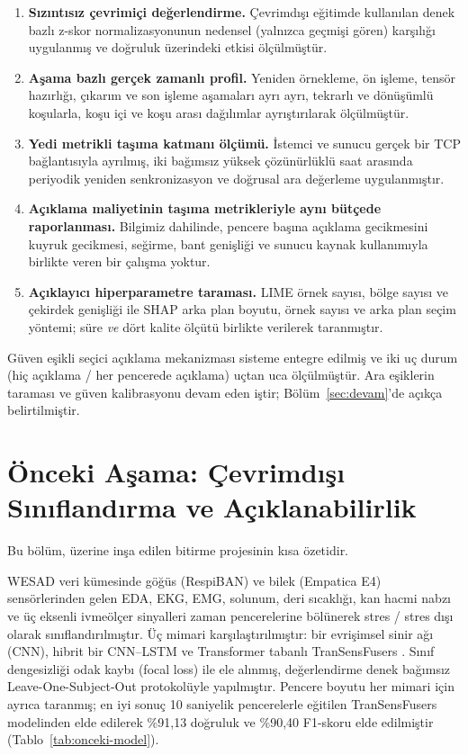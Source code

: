 \documentclass[conference]{IEEEtran}
\begin{document}
\begin{enumerate}
\item \textbf{Sızıntısız çevrimiçi değerlendirme.} Çevrimdışı eğitimde kullanılan
denek bazlı z-skor normalizasyonunun nedensel (yalnızca geçmişi gören) karşılığı
uygulanmış ve doğruluk üzerindeki etkisi ölçülmüştür.
\item \textbf{Aşama bazlı gerçek zamanlı profil.} Yeniden örnekleme, ön işleme,
tensör hazırlığı, çıkarım ve son işleme aşamaları ayrı ayrı, tekrarlı ve
dönüşümlü koşularla, koşu içi ve koşu arası dağılımlar ayrıştırılarak
ölçülmüştür.
\item \textbf{Yedi metrikli taşıma katmanı ölçümü.} İstemci ve sunucu gerçek bir
TCP bağlantısıyla ayrılmış, iki bağımsız yüksek çözünürlüklü saat arasında
periyodik yeniden senkronizasyon ve doğrusal ara değerleme uygulanmıştır.
\item \textbf{Açıklama maliyetinin taşıma metrikleriyle aynı bütçede
raporlanması.} Bilgimiz dahilinde, pencere başına açıklama gecikmesini kuyruk
gecikmesi, seğirme, bant genişliği ve sunucu kaynak kullanımıyla birlikte veren
bir çalışma yoktur.
\item \textbf{Açıklayıcı hiperparametre taraması.} LIME örnek sayısı, bölge
sayısı ve çekirdek genişliği ile SHAP arka plan boyutu, örnek sayısı ve arka plan
seçim yöntemi; süre \emph{ve} dört kalite ölçütü birlikte verilerek taranmıştır.
\end{enumerate}

Güven eşikli seçici açıklama mekanizması sisteme entegre edilmiş ve iki uç durum
(hiç açıklama / her pencerede açıklama) uçtan uca ölçülmüştür. Ara eşiklerin
taraması ve güven kalibrasyonu devam eden iştir; Bölüm~\ref{sec:devam}'de açıkça
belirtilmiştir.

\section{Önceki Aşama: Çevrimdışı Sınıflandırma ve Açıklanabilirlik}
\label{sec:onceki}

Bu bölüm, üzerine inşa edilen bitirme projesinin \cite{bitirme2026} kısa
özetidir.

WESAD veri kümesinde \cite{schmidt2018} göğüs (RespiBAN) ve bilek (Empatica E4)
sensörlerinden gelen EDA, EKG, EMG, solunum, deri sıcaklığı, kan hacmi nabzı ve
üç eksenli ivmeölçer sinyalleri zaman pencerelerine bölünerek stres / stres dışı
olarak sınıflandırılmıştır. Üç mimari karşılaştırılmıştır: bir evrişimsel sinir
ağı (CNN), hibrit bir CNN--LSTM ve Transformer tabanlı TranSensFusers
\cite{kasnesis2025}. Sınıf dengesizliği odak kaybı (focal loss)
\cite{lin2017} ile ele alınmış, değerlendirme denek bağımsız
Leave-One-Subject-Out protokolüyle yapılmıştır. Pencere boyutu her mimari için
ayrıca taranmış; en iyi sonuç 10 saniyelik pencerelerle eğitilen TranSensFusers
modelinden elde edilerek \%91{,}13 doğruluk ve \%90{,}40 F1-skoru elde edilmiştir
(Tablo~\ref{tab:onceki-model}).
\end{document}
